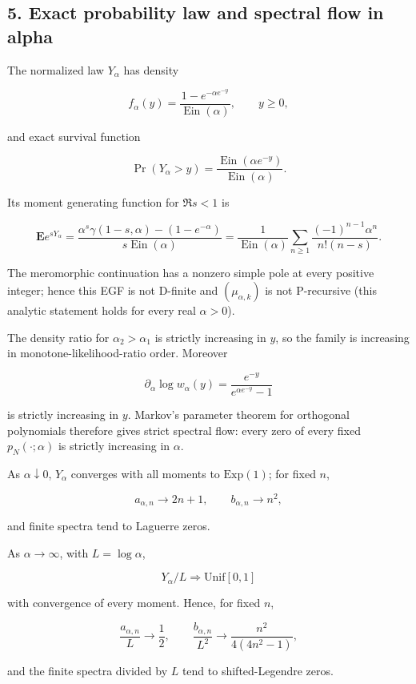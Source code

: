 \documentclass[11pt]{article}
\theoremstyle{keio}
\theoremstyle{definition}
\theoremstyle{remark}
\newcommand{\Ein}{\operatorname{Ein}}
\begin{document}
\subsection{5. Exact probability law and spectral flow in alpha}

The normalized law \(Y_\alpha\) has density

\[
f_\alpha(y)=\frac{1-e^{-\alpha e^{-y}}}{\Ein(\alpha)},\qquad y\ge0,
\]

and exact survival function

\[
\Pr(Y_\alpha>y)=\frac{\Ein(\alpha e^{-y})}{\Ein(\alpha)}. \tag{TP-6}
\]

Its moment generating function for \(\Re s<1\) is

\[
\mathbf E e^{sY_\alpha}
=\frac{\alpha^s\gamma(1-s,\alpha)-(1-e^{-\alpha})}
{s\Ein(\alpha)}
=\frac1{\Ein(\alpha)}\sum_{n\ge1}
\frac{(-1)^{n-1}\alpha^n}{n!(n-s)}. \tag{TP-7}
\]

The meromorphic continuation has a nonzero simple pole at every positive
integer; hence this EGF is not D-finite and \((\mu_{\alpha,k})\) is not
P-recursive (this analytic statement holds for every real \(\alpha>0\)).

The density ratio for \(\alpha_2>\alpha_1\) is strictly increasing in \(y\),
so the family is increasing in monotone-likelihood-ratio order. Moreover

\[
\partial_\alpha\log w_\alpha(y)
=\frac{e^{-y}}{e^{\alpha e^{-y}}-1}
\]

is strictly increasing in \(y\). Markov's parameter theorem for orthogonal
polynomials therefore gives strict spectral flow: every zero of every fixed
\(p_N(\cdot;\alpha)\) is strictly increasing in \(\alpha\).

As \(\alpha\downarrow0\), \(Y_\alpha\) converges with all moments to
\(\mathrm{Exp}(1)\); for fixed \(n\),

\[
a_{\alpha,n}\to2n+1,\qquad b_{\alpha,n}\to n^2,
\]

and finite spectra tend to Laguerre zeros.

As \(\alpha\to\infty\), with \(L=\log\alpha\),

\[
Y_\alpha/L\Longrightarrow\mathrm{Unif}[0,1]
\]

with convergence of every moment. Hence, for fixed \(n\),

\[
\frac{a_{\alpha,n}}L\to\frac12,
\qquad
\frac{b_{\alpha,n}}{L^2}\to\frac{n^2}{4(4n^2-1)},
\]

and the finite spectra divided by \(L\) tend to shifted-Legendre zeros.
\end{document}
